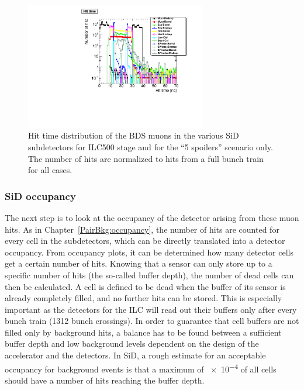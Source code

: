 \begin{figure}[htbp!]
\centering
\includegraphics[width=0.7\textwidth]{Figures/BDS_muons/hittime_ILC500_spoilers_superimposed.pdf}
\caption[Muon hit time in the SiD subdetectors]{Hit time distribution of the BDS muons in the various SiD subdetectors for ILC500 stage and for the ``5 spoilers'' scenario only.
The number of hits are normalized to hits from a full bunch train for all cases.}
\label{fig:BDS_Muons:hittime}
\end{figure}

\subsubsection{SiD occupancy}
The next step is to look at the occupancy of the detector arising from these muon hits.
As in Chapter~\ref{PairBkg:occupancy}, the number of hits are counted for every cell in the subdetectors, which can be directly translated into a detector occupancy.
From occupancy plots, it can be determined how many detector cells get a certain number of hits.
Knowing that a sensor can only store up to a specific number of hits (the so-called buffer depth), the number of dead cells can then be calculated.
A cell is defined to be dead when the buffer of its sensor is already completely filled, and no further hits can be stored.
This is especially important as the detectors for the ILC will read out their buffers only after every bunch train (1312 bunch crossings).
In order to guarantee that cell buffers are not filled only by background hits, a balance has to be found between a sufficient buffer depth and low background levels dependent on the design of the accelerator and the detectors.
In SiD, a rough estimate for an acceptable occupancy for background events is that a maximum of \num{e-4} of all cells should have a number of hits reaching the buffer depth. 

